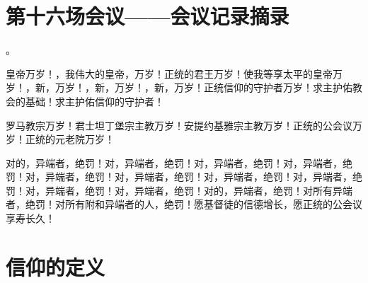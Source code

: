 
\section{第十六场会议——会议记录摘录}

。\par

皇帝万岁！，我伟大的皇帝，万岁！正统的君王万岁！使我等享太平的皇帝万岁！，新，万岁！，新，万岁！，新，万岁！正统信仰的守护者万岁！求主护佑教会的基础！求主护佑信仰的守护者！\par

罗马教宗万岁！君士坦丁堡宗主教万岁！安提约基雅宗主教万岁！正统的公会议万岁！正统的元老院万岁！\par

对的，异端者，绝罚！\newline{}对，异端者，绝罚！\newline{}对，异端者，绝罚！\newline{}对，异端者，绝罚！\newline{}对，异端者，绝罚！\newline{}对，异端者，绝罚！\newline{}对，异端者，绝罚！\newline{}对，异端者，绝罚！\newline{}对，异端者，绝罚！\newline{}对，异端者，绝罚！\newline{}对的，异端者，绝罚！\newline{}对所有异端者，绝罚！对所有附和异端者的人，绝罚！\newline{}愿基督徒的信德增长，愿正统的公会议享寿长久！\par


\section{信仰的定义}

